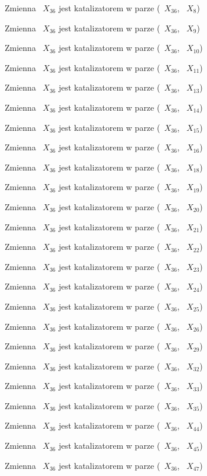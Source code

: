 \documentclass{article}
\begin{document}
Zmienna ~$X_{36}$ jest katalizatorem w parze (~$X_{36}$, ~$X_{8}$)

Zmienna ~$X_{36}$ jest katalizatorem w parze (~$X_{36}$, ~$X_{9}$)

Zmienna ~$X_{36}$ jest katalizatorem w parze (~$X_{36}$, ~$X_{10}$)

Zmienna ~$X_{36}$ jest katalizatorem w parze (~$X_{36}$, ~$X_{11}$)

Zmienna ~$X_{36}$ jest katalizatorem w parze (~$X_{36}$, ~$X_{13}$)

Zmienna ~$X_{36}$ jest katalizatorem w parze (~$X_{36}$, ~$X_{14}$)

Zmienna ~$X_{36}$ jest katalizatorem w parze (~$X_{36}$, ~$X_{15}$)

Zmienna ~$X_{36}$ jest katalizatorem w parze (~$X_{36}$, ~$X_{16}$)

Zmienna ~$X_{36}$ jest katalizatorem w parze (~$X_{36}$, ~$X_{18}$)

Zmienna ~$X_{36}$ jest katalizatorem w parze (~$X_{36}$, ~$X_{19}$)

Zmienna ~$X_{36}$ jest katalizatorem w parze (~$X_{36}$, ~$X_{20}$)

Zmienna ~$X_{36}$ jest katalizatorem w parze (~$X_{36}$, ~$X_{21}$)

Zmienna ~$X_{36}$ jest katalizatorem w parze (~$X_{36}$, ~$X_{22}$)

Zmienna ~$X_{36}$ jest katalizatorem w parze (~$X_{36}$, ~$X_{23}$)

Zmienna ~$X_{36}$ jest katalizatorem w parze (~$X_{36}$, ~$X_{24}$)

Zmienna ~$X_{36}$ jest katalizatorem w parze (~$X_{36}$, ~$X_{25}$)

Zmienna ~$X_{36}$ jest katalizatorem w parze (~$X_{36}$, ~$X_{26}$)

Zmienna ~$X_{36}$ jest katalizatorem w parze (~$X_{36}$, ~$X_{29}$)

Zmienna ~$X_{36}$ jest katalizatorem w parze (~$X_{36}$, ~$X_{32}$)

Zmienna ~$X_{36}$ jest katalizatorem w parze (~$X_{36}$, ~$X_{33}$)

Zmienna ~$X_{36}$ jest katalizatorem w parze (~$X_{36}$, ~$X_{35}$)

Zmienna ~$X_{36}$ jest katalizatorem w parze (~$X_{36}$, ~$X_{44}$)

Zmienna ~$X_{36}$ jest katalizatorem w parze (~$X_{36}$, ~$X_{45}$)

Zmienna ~$X_{36}$ jest katalizatorem w parze (~$X_{36}$, ~$X_{47}$)
\end{document}
